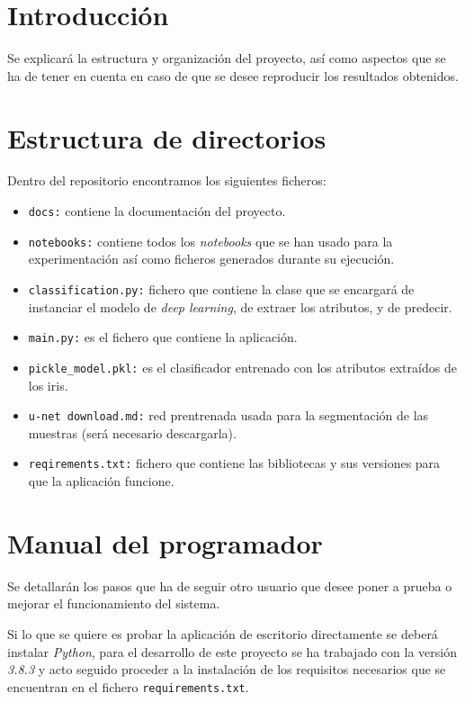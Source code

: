
\section{Introducción}
Se explicará la estructura y organización del proyecto, así como aspectos que se ha de tener en cuenta en caso de que se desee reproducir los resultados obtenidos.
\section{Estructura de directorios}
Dentro del repositorio encontramos los siguientes ficheros:
\begin{itemize}
    \item \texttt{docs:} contiene la documentación del proyecto.
    \item \texttt{notebooks:} contiene todos los \emph{notebooks} que se han usado para la experimentación así como ficheros generados durante su ejecución.
    \item \texttt{classification.py:} fichero que contiene la clase que se encargará de instanciar el modelo de \emph{deep learning}, de extraer los atributos, y de predecir.
    \item \texttt{main.py:} es el fichero que contiene la aplicación.
    \item \texttt{pickle\_model.pkl:} es el clasificador entrenado con los atributos extraídos de los iris.
    \item \texttt{u-net download.md:} red prentrenada usada para la segmentación de las muestras (será necesario descargarla).
    \item \texttt{reqirements.txt:} fichero que contiene las bibliotecas y sus versiones para que la aplicación funcione.
\end{itemize}
\section{Manual del programador}
Se detallarán los pasos que ha de seguir otro usuario que desee poner a prueba o mejorar el funcionamiento del sistema.

Si lo que se quiere es probar la aplicación de escritorio directamente se deberá instalar \emph{Python}, para el desarrollo de este proyecto se ha trabajado con la versión \emph{3.8.3} y acto seguido proceder a la instalación de los requisitos necesarios que se encuentran en el fichero \texttt{requirements.txt}. 

